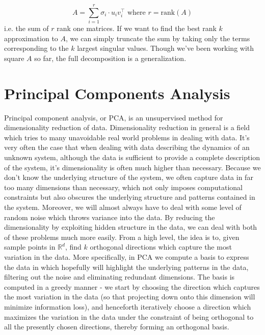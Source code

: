 \documentclass{article}
\begin{document}
$$ A = \sum_{i = 1}^r \sigma_i \cdot u_i v_i^\intercal \text{ where } r = \text{rank}(A) $$
i.e. the sum of $ r $ rank one matrices. If we want to find the best rank $ k $ approximation to $ A $, we can simply truncate the sum by taking only the terms corresponding to the $ k $ largest singular values. Though we've been working with square $ A $ so far, the full decomposition is a generalization.

\section{Principal Components Analysis}
Principal component analysis, or PCA, is an unsupervised method for dimensionality reduction of data. Dimensionality reduction in general is a field which tries to many unavoidable real world problems in dealing with data. It's very often the case that when dealing with data describing the dynamics of an unknown system, although the data is sufficient to provide a complete description of the system, it's dimensionality is often much higher than necessary. Because we don't know the underlying structure of the system, we often capture data in far too many dimensions than necessary, which not only imposes computational constraints but also obscures the underlying structure and patterns contained in the system. Moreover, we will almost always have to deal with some level of random noise which throws variance into the data. By reducing the dimensionality by exploiting hidden structure in the data, we can deal with both of these problems much more easily.
\newline \newline
From a high level, the idea is to, given sample points in $ \mathbb{R}^d $, find $ k $ orthogonal directions which capture the most variation in the data. More specifically, in PCA we compute a basis to express the data in which hopefully will highlight the underlying patterns in the data, filtering out the noise and eliminating redundant dimensions. The basis is computed in a greedy manner - we start by choosing the direction which captures the most variation in the data (so that projecting down onto this dimension will minimize information loss), and henceforth iteratively choose a direction which maximizes the variation in the data under the constraint of being orthogonal to all the presently chosen directions, thereby forming an orthogonal basis.
\newline \newline
\end{document}
